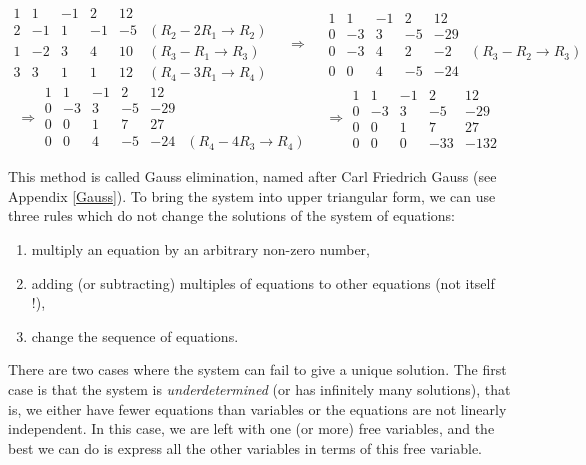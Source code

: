 \documentclass[
  letterpaper,
  DIV=11,
  numbers=noendperiod]{scrartcl}
\theoremstyle{remark}
\begin{document}
\[\begin{array}{rrrr|rl}
 1 &   1& -1 & 2& 12 & \\
 2 &  -1 & 1& -1 &-5 & (R_{2}-2R_{1}\rightarrow R_{2})\\
1  &   -2& 3 & 4  & 10 & (R_{3}-R_{1}\rightarrow R_{3})\\
3 & 3 &1 & 1 & 12  &   (R_{4}-3R_{1}\rightarrow R_{4})
\end{array}  \quad \Rightarrow \quad 
 \begin{array}{rrrr|rl}
 1 &   1& -1 & 2& 12  &\\
 0&  -3 & 3& -5 &-29 & \\
0  &   -3& 4 & 2  & -2 & (R_{3}-R_{2}\rightarrow R_{3}) \\
0 & 0 &4 & -5 & -24 &    
\end{array}\] \[\Rightarrow \begin{array}{rrrr|rl}
 1 &   1& -1 & 2& 12 & \\
 0&  -3 & 3& -5 &-29 &\\
0  &   0& 1 & 7  & 27 &\\
0 & 0 &4 & -5 & -24   & (R_{4}-4R_{3}\rightarrow R_{4}) 
\end{array}
\quad \Rightarrow \begin{array}{rrrr|r}
 1 &   1& -1 & 2& 12  \\
 0&  -3 & 3& -5 &-29 \\
0  &   0& 1 & 7  & 27 \\
0 & 0 &0 & -33 & -132    
\end{array}\]

This method is called Gauss elimination, named after Carl Friedrich
Gauss (see Appendix \hyperref[Gauss]{{[}Gauss{]}}). To bring the system
into upper triangular form, we can use three rules which do not change
the solutions of the system of equations:

\begin{enumerate}
\def\labelenumi{\arabic{enumi}.}
\item
  multiply an equation by an arbitrary non-zero number,
\item
  adding (or subtracting) multiples of equations to other equations (not
  itself !),
\item
  change the sequence of equations.
\end{enumerate}

There are two cases where the system can fail to give a unique solution.
The first case is that the system is \emph{underdetermined} (or has
infinitely many solutions), that is, we either have fewer equations than
variables or the equations are not linearly independent. In this case,
we are left with one (or more) free variables, and the best we can do is
express all the other variables in terms of this free variable.
\end{document}
